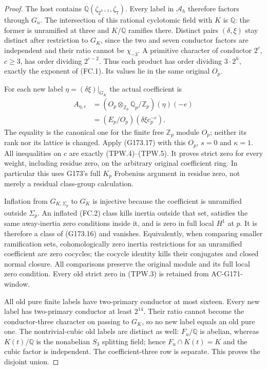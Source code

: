 \begin{proof}
The host contains $\mathbb Q(\zeta_{2^{h+2}},\zeta_7)$.
Every label in $\mathscr A_h$ therefore factors through $G_u$.
The intersection of this rational cyclotomic field with $K$ is
$\mathbb Q$: the former is unramified at three and $K/\mathbb Q$
ramifies there.  Distinct pairs $(\delta,\xi)$ stay distinct after
restriction to $G_K$, since the two and seven conductor factors are
independent and their ratio cannot be $\chi_{-3}$.
A primitive character of conductor $2^c$, $c\geq3$, has order dividing
$2^{c-2}$.  Thus each product has order dividing $3\cdot2^h$, exactly
the exponent of (FC.1).  Its values lie in the same original $O_p$.

For each new label $\eta=(\delta\xi)|_{G_K}$ the actual coefficient is
\[
 \begin{aligned}
 A_{\eta,e}
  &=(O_p\otimes_{\mathbb Z_p}\mathbb Q_p/\mathbb Z_p)(\eta)(-e)\\
  &=(E_p/O_p)(\delta\xi c_p^{-e}).
 \end{aligned}
 \tag{TPW.9}
\]
The equality is the canonical one for the finite free $\mathbb Z_p$
module $O_p$; neither its rank nor its lattice is changed.
Apply (G173.17) with this $O_p$, $s=0$ and $\kappa=1$.
All inequalities on $c$ are exactly (TPW.4)--(TPW.5).
It proves strict zero for every weight, including residue zero,
on the arbitrary original coefficient ring.
In particular this uses G173's full $K_p$ Frobenius argument in
residue zero, not merely a residual class-group calculation.

Inflation from $G_{K,\Sigma_p}$ to $G_K$ is injective because the
coefficient is unramified outside $\Sigma_p$.
An inflated (FC.2) class kills inertia outside that set, satisfies
the same away-inertia zero conditions inside it, and is zero in
full local $H^1$ at $p$.  It is therefore a class of (G173.16) and
vanishes.  Equivalently, when comparing smaller ramification sets,
cohomologically zero inertia restrictions for an unramified coefficient
are zero cocycles; the cocycle identity kills their conjugates and
closed normal closure.  All comparisons preserve the original module
and its full local zero condition.
Every old strict zero in (TPW.3) is retained from AC-G171-window.

All old pure finite labels have two-primary conductor at most sixteen.
Every new label has two-primary conductor at least $2^{14}$.
Their ratio cannot become the conductor-three character on passing to
$G_K$, so no new label equals an old pure one.
The nontrivial-cubic old labels are distinct as well: $F_u/\mathbb Q$
is abelian, whereas $K(t)/\mathbb Q$ is the nonabelian $S_3$ splitting
field; hence $F_u\cap K(t)=K$ and the cubic factor is independent.
The coefficient-three row is separate.  This proves the disjoint union.


\end{proof}
